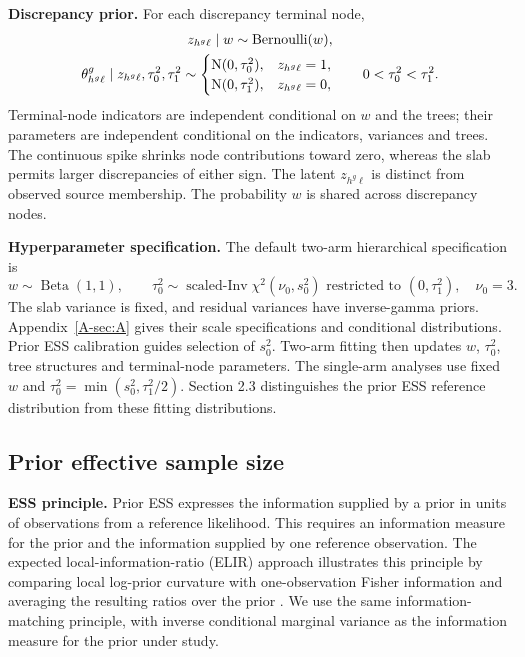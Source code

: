 \documentclass[11pt]{article}
\begin{document}
\noindent\textbf{Discrepancy prior.}
For each discrepancy terminal node,
\begin{equation}\label{eq:mixture}
\begin{gathered}
z_{h^g\ell}\mid w\sim\operatorname{Bernoulli}(w),\\
\theta^g_{h^g\ell}\mid z_{h^g\ell},\tau_0^2,\tau_1^2\sim
\begin{cases}\mathrm{N}(0,\tau_0^2),&z_{h^g\ell}=1,\\
\mathrm{N}(0,\tau_1^2),&z_{h^g\ell}=0,
\end{cases}\qquad 0<\tau_0^2<\tau_1^2.
\end{gathered}
\end{equation}
Terminal-node indicators are independent conditional on $w$ and the trees; their parameters are independent conditional on the indicators, variances and trees. The continuous spike shrinks node contributions toward zero, whereas the slab permits larger discrepancies of either sign. The latent $z_{h^g\ell}$ is distinct from observed source membership. The probability $w$ is shared across discrepancy nodes.

\noindent\textbf{Hyperparameter specification.}
The default two-arm hierarchical specification is
\begin{equation}\label{eq:hyper}
w\sim\operatorname{Beta}(1,1),\qquad
\tau_0^2\sim\operatorname{scaled\text{-}Inv}\chi^2(\nu_0,s_0^2)
\text{ restricted to }(0,\tau_1^2),\quad\nu_0=3.
\end{equation}
The slab variance is fixed, and residual variances have inverse-gamma priors. Appendix~\ref{A-sec:A} gives their scale specifications and conditional distributions. Prior ESS calibration guides selection of $s_0^2$. Two-arm fitting then updates $w$, $\tau_0^2$, tree structures and terminal-node parameters. The single-arm analyses use fixed $w$ and $\tau_0^2=\min(s_0^2,\tau_1^2/2)$. Section 2.3 distinguishes the prior ESS reference distribution from these fitting distributions.

\subsection{Prior effective sample size}
\noindent\textbf{ESS principle.}
Prior ESS expresses the information supplied by a prior in units of observations from a reference likelihood. This requires an information measure for the prior and the information supplied by one reference observation. The expected local-information-ratio (ELIR) approach illustrates this principle by comparing local log-prior curvature with one-observation Fisher information and averaging the resulting ratios over the prior \citep{neuenschwander2020}. We use the same information-matching principle, with inverse conditional marginal variance as the information measure for the prior under study.
\end{document}
